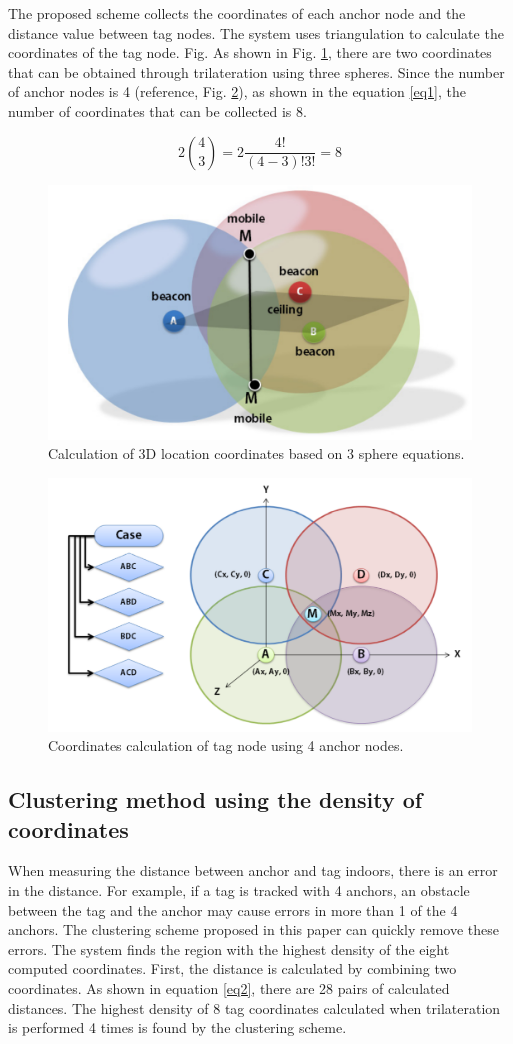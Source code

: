\documentclass[conference]{IEEEtran}
\begin{document}
The proposed scheme collects the coordinates of each anchor node and the distance value between tag nodes. The system uses triangulation to calculate the coordinates of the tag node. Fig. As shown in Fig. \ref{fig1}, there are two coordinates that can be obtained through trilateration using three spheres. Since the number of anchor nodes is 4 (reference, Fig. \ref{fig2}), as shown in the equation \ref{eq1}, the number of coordinates that can be collected is 8.

\begin{equation}
    2\binom{4}{3} = 2\frac{4!}{(4-3)!3!}=8\label{eq1}
\end{equation}

\begin{figure}[htbp]
    \centerline{\includegraphics[width=0.62\columnwidth]{fig2.png}}
    \caption{Calculation of 3D location coordinates based on 3 sphere equations.}
    \label{fig1}
\end{figure}

\begin{figure}[htbp]
    \centerline{\includegraphics[width=0.62\columnwidth]{fig1.png}}
    \caption{Coordinates calculation of tag node using 4 anchor nodes.}
    \label{fig2}
\end{figure}

\subsection{Clustering method using the density of coordinates}
When measuring the distance between anchor and tag indoors, there is an error in the distance. For example, if a tag is tracked with 4 anchors, an obstacle between the tag and the anchor may cause errors in more than 1 of the 4 anchors. The clustering scheme proposed in this paper can quickly remove these errors. The system finds the region with the highest density of the eight computed coordinates. First, the distance is calculated by combining two coordinates. As shown in equation \ref{eq2}, there are 28 pairs of calculated distances. The highest density of 8 tag coordinates calculated when trilateration is performed 4 times is found by the clustering scheme.
\end{document}

